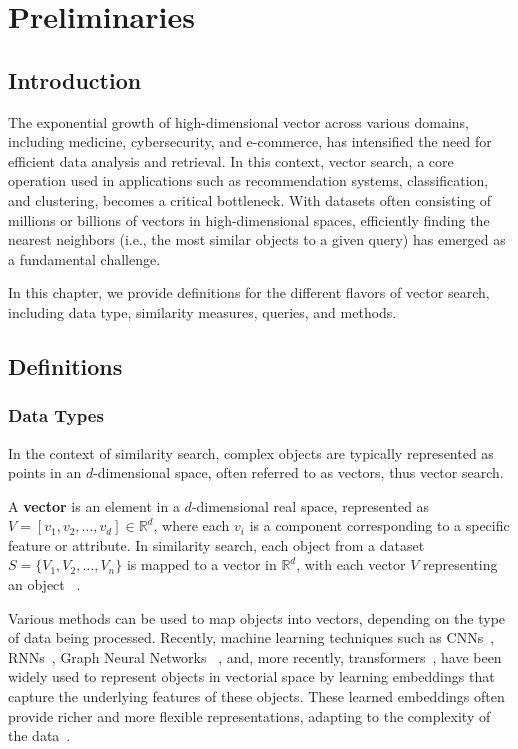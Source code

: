 \graphicspath{{../img/problem/}}
\chapter{Preliminaries}
\label{chapter:problem}

\section{Introduction}
The exponential growth of high-dimensional vector across various domains, including medicine, cybersecurity, and e-commerce, has intensified the need for efficient data analysis and retrieval. In this context, vector search, a core operation used in applications such as recommendation systems, classification, and clustering, becomes a critical bottleneck. With datasets often consisting of millions or billions of vectors in high-dimensional spaces, efficiently finding the nearest neighbors (i.e., the most similar objects to a given query) has emerged as a fundamental challenge.

In this chapter, we provide definitions for the different flavors of vector search, including data type, similarity measures, queries, and methods. 
\clearpage

\section{Definitions}
\label{sec:definitions}

\subsection{Data Types}
In the context of similarity search, complex objects are typically represented as points in an \(d\)-dimensional space, often referred to as vectors, thus vector search. 

 A \textbf{vector} is an element in a \(d\)-dimensional real space, represented as \(V = [v_1, v_2, \dots, v_d] \in \mathbb{R}^d\), where each \(v_i\) is a component corresponding to a specific feature or attribute. In similarity search, each object from a dataset \(S = \{V_1, V_2, \dots, V_n\}\) is mapped to a vector in \(\mathbb{R}^d\), with each vector \(V\) representing an object ~\cite{vector}.


Various methods can be used to map objects into vectors, depending on the type of data being processed. Recently, machine learning techniques such as CNNs~\cite{cnn,cnn1}, RNNs~\cite{rnn,rnn1}, Graph Neural Networks ~\cite{gnn,gnn1}, and, more recently, transformers~\cite{transf,transf1,transf2,transf3}, have been widely used to represent objects in vectorial space by learning embeddings that capture the underlying features of these objects. These learned embeddings often provide richer and more flexible representations, adapting to the complexity of the data~\cite{lemb,lemb1}.

